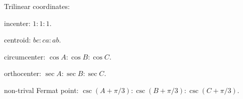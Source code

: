 Trilinear coordinates:
\begin{compactenum}
	\item incenter: $1:1:1$.
	\item centroid: $bc:ca:ab$.
	\item circumcenter: $\cos A:\cos B:\cos C$.
	\item orthocenter: $\sec A:\sec B:\sec C$.
	\item non-trival Fermat point: $\csc(A+\pi/3):\csc(B+\pi/3):\csc(C+\pi/3)$.
\end{compactenum}
\inputminted{cpp}{src/geometry/2d-geometry/triangle-center.cpp.com}

